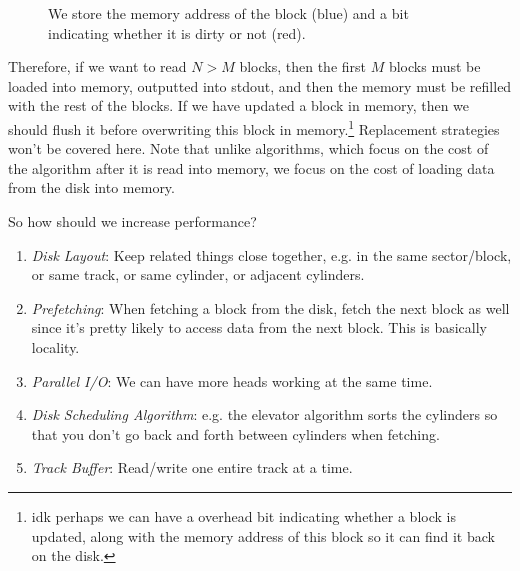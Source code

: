 \begin{definition}
\begin{figure}[H]
      \caption{We store the memory address of the block (blue) and a bit indicating whether it is dirty or not (red). } 
      \label{fig:disk_memory}
    \end{figure}
  \end{definition}

  Therefore, if we want to read $N > M$ blocks, then the first $M$ blocks must be loaded into memory, outputted into stdout, and then the memory must be refilled with the rest of the blocks. If we have updated a block in memory, then we should flush it before overwriting this block in memory.\footnote{idk perhaps we can have a overhead bit indicating whether a block is updated, along with the memory address of this block so it can find it back on the disk.} Replacement strategies won't be covered here. Note that unlike algorithms, which focus on the cost of the algorithm after it is read into memory, we focus on the cost of loading data from the disk into memory. 

  So how should we increase performance? 
  \begin{enumerate}
    \item \textit{Disk Layout}: Keep related things close together, e.g. in the same sector/block, or same track, or same cylinder, or adjacent cylinders. 
    \item \textit{Prefetching}: When fetching a block from the disk, fetch the next block as well since it's pretty likely to access data from the next block. This is basically locality. 
    \item \textit{Parallel I/O}: We can have more heads working at the same time. 
    \item \textit{Disk Scheduling Algorithm}: e.g. the elevator algorithm sorts the cylinders so that you don't go back and forth between cylinders when fetching.  
    \item \textit{Track Buffer}: Read/write one entire track at a time. 
  \end{enumerate}

